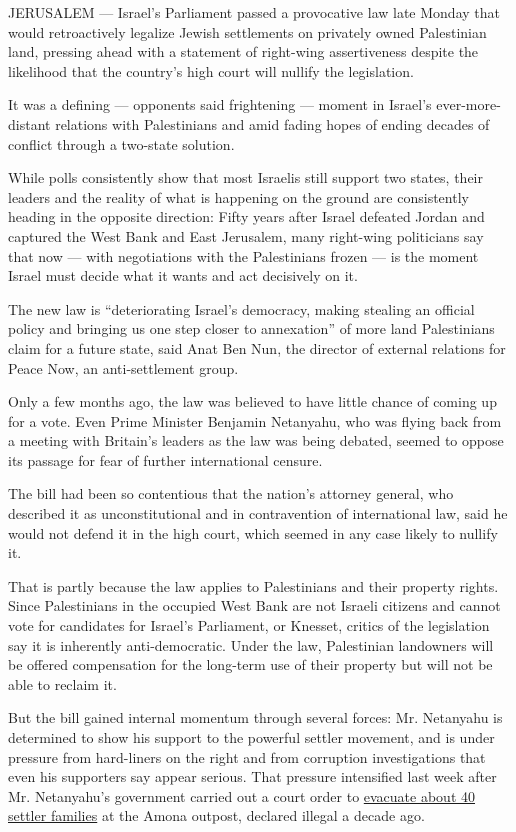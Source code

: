 JERUSALEM --- Israel's Parliament passed a provocative law late Monday
that would retroactively legalize Jewish settlements on privately owned
Palestinian land, pressing ahead with a statement of right-wing
assertiveness despite the likelihood that the country's high court will
nullify the legislation.

It was a defining --- opponents said frightening --- moment in Israel's
ever-more-distant relations with Palestinians and amid fading hopes of
ending decades of conflict through a two-state solution.

While polls consistently show that most Israelis still support two
states, their leaders and the reality of what is happening on the ground
are consistently heading in the opposite direction: Fifty years after
Israel defeated Jordan and captured the West Bank and East Jerusalem,
many right-wing politicians say that now --- with negotiations with the
Palestinians frozen --- is the moment Israel must decide what it wants
and act decisively on it.

The new law is ``deteriorating Israel's democracy, making stealing an
official policy and bringing us one step closer to annexation'' of more
land Palestinians claim for a future state, said Anat Ben Nun, the
director of external relations for Peace Now, an anti-settlement group.

Only a few months ago, the law was believed to have little chance of
coming up for a vote. Even Prime Minister Benjamin Netanyahu, who was
flying back from a meeting with Britain's leaders as the law was being
debated, seemed to oppose its passage for fear of further international
censure.

The bill had been so contentious that the nation's attorney general, who
described it as unconstitutional and in contravention of international
law, said he would not defend it in the high court, which seemed in any
case likely to nullify it.

That is partly because the law applies to Palestinians and their
property rights. Since Palestinians in the occupied West Bank are not
Israeli citizens and cannot vote for candidates for Israel's Parliament,
or Knesset, critics of the legislation say it is inherently
anti-democratic. Under the law, Palestinian landowners will be offered
compensation for the long-term use of their property but will not be
able to reclaim it.

But the bill gained internal momentum through several forces: Mr.
Netanyahu is determined to show his support to the powerful settler
movement, and is under pressure from hard-liners on the right and from
corruption investigations that even his supporters say appear serious.
That pressure intensified last week after Mr. Netanyahu's government
carried out a court order to
\href{https://www.nytimes.com/2017/02/01/world/middleeast/amona-west-bank-settlers-eviction.html}{evacuate
about 40 settler families} at the Amona outpost, declared illegal a
decade ago.

